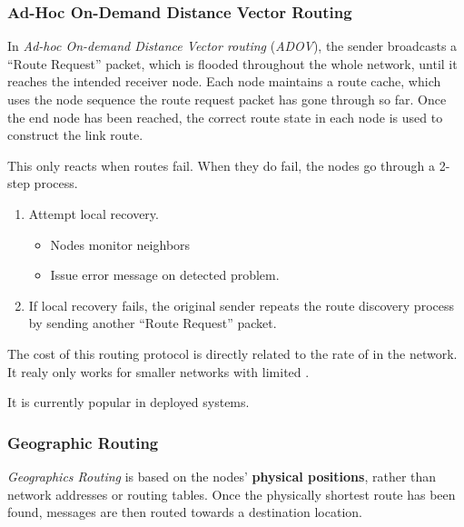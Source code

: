\subsubsection{Ad-Hoc On-Demand Distance Vector Routing}\label{subsubsec:ADOV_Routing}
\begin{definition}\label{def:ADOV_Routing}
  In \emph{Ad-hoc On-demand Distance Vector routing} (\emph{ADOV}), the sender broadcasts a ``Route Request'' packet, which is flooded throughout the whole network, until it reaches the intended receiver node.
  Each node maintains a route cache, which uses the node sequence the route request packet has gone through so far.
  Once the end node has been reached, the correct route state in each node is used to construct the link route.

  This only reacts when routes fail.
  When they do fail, the nodes go through a 2-step process.
  \begin{enumerate}[noitemsep]
  \item Attempt local recovery.
    \begin{itemize}[noitemsep]
    \item Nodes monitor neighbors
    \item Issue error message on detected problem.
    \end{itemize}
  \item If local recovery fails, the original sender repeats the route discovery process by sending another ``Route Request'' packet.
  \end{enumerate}

  The cost of this routing protocol is directly related to the rate of  in the network.
  It realy only works for smaller networks with limited .

  It is currently popular in deployed systems.
\end{definition}

\subsubsection{Geographic Routing}\label{subsubsec:Geographic_Routing}
\begin{definition}\label{def:Geographic_Routing}
  \emph{Geographics Routing} is based on the nodes’ \textbf{physical positions}, rather than network addresses or routing tables.
  Once the physically shortest route has been found, messages are then routed towards a destination location.
\end{definition}

